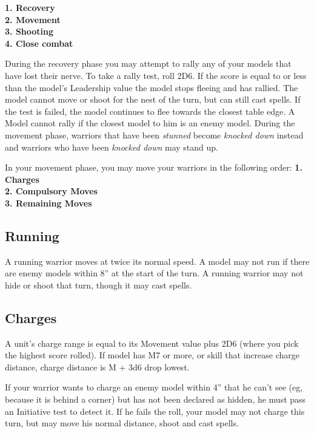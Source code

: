 \begin{multicols}{2}
\begin{nscenter}
\textbf{1. Recovery} \\
\textbf{2. Movement} \\
\textbf{3. Shooting} \\
\textbf{4. Close combat}
\end{nscenter}
\end{multicols}

{\small During the recovery phase you may attempt to rally
any of your models that have lost their nerve. To
take a rally test, roll 2D6. If the score is equal to or
less than the model's Leadership value the model
stops fleeing and has rallied. The model cannot
move or shoot for the nest of the turn, but can still
cast spells. If the test is failed, the model continues
to flee towards the closest table edge. A Model cannot rally if the closest model to him is
an enemy model. During the movement phase, warriors that have been
\textit{stunned} become \textit{knocked down} instead and warriors
who have been \textit{knocked down} may stand up.}

In your movement phase, you may move your
warriors in the following order:
\textbf{1. Charges} \\
\textbf{2. Compulsory Moves} \\
\textbf{3. Remaining Moves}		


\subsection*{Running}

A running warrior moves at twice its normal speed.
A model may not run if there are enemy models
within 8” at the start of the turn.
A running warrior may not hide or shoot that turn,
though it may cast spells.

\subsection*{Charges}
A unit's charge range is equal to its Movement value plus 2D6 (where you pick the highest score rolled). If model has M7 or more, or skill that increase charge distance, charge distance is M + 3d6 drop lowest.

If your warrior wants to charge an enemy model within
4” that he can’t see (eg, because it is behind a corner)
but has not been declared as hidden, he must pass an
Initiative test to detect it. If he fails the roll, your
model may not charge this turn, but may move his
normal distance, shoot and cast spells.

